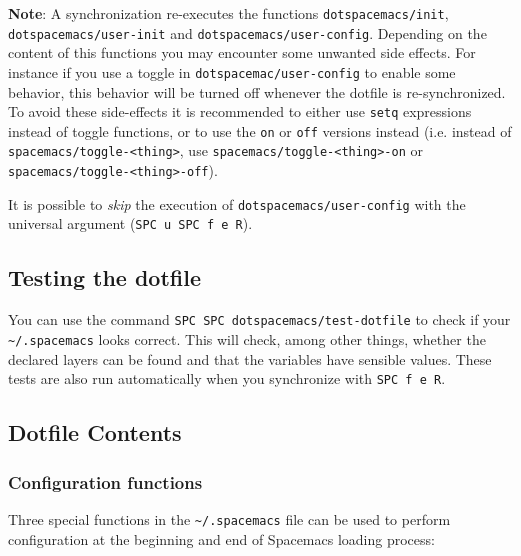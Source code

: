 \documentclass[11pt]{article}
\begin{document}
\textbf{Note}: A synchronization re-executes the functions \texttt{dotspacemacs/init},
\texttt{dotspacemacs/user-init} and \texttt{dotspacemacs/user-config}.
Depending on the content of this functions you may encounter some unwanted side
effects. For instance if you use a toggle in \texttt{dotspacemac/user-config} to enable
some behavior, this behavior will be turned off whenever the dotfile is
re-synchronized. To avoid these side-effects it is recommended to either use
\texttt{setq} expressions instead of toggle functions, or to use the \texttt{on} or \texttt{off}
versions instead (i.e. instead of \texttt{spacemacs/toggle-<thing>}, use
\texttt{spacemacs/toggle-<thing>-on} or \texttt{spacemacs/toggle-<thing>-off}).

It is possible to \emph{skip} the execution of \texttt{dotspacemacs/user-config} with the
universal argument (\texttt{SPC u SPC f e R}).

\subsection{Testing the dotfile}
\label{sec:orge4dded9}
You can use the command \texttt{SPC SPC dotspacemacs/test-dotfile} to check if your
\texttt{\textasciitilde{}/.spacemacs} looks correct. This will check, among other things, whether the
declared layers can be found and that the variables have sensible values. These
tests are also run automatically when you synchronize with \texttt{SPC f e R}.

\subsection{Dotfile Contents}
\label{sec:orge477d8f}
\subsubsection{Configuration functions}
\label{sec:orga3302d3}
Three special functions in the \texttt{\textasciitilde{}/.spacemacs} file can be used to perform
configuration at the beginning and end of Spacemacs loading process:
\end{document}
